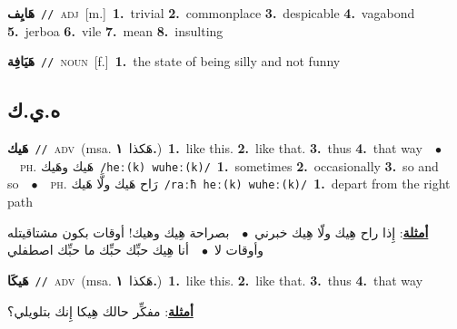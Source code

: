 \documentclass[10pt,a4paper,twoside]{article} %
\begin{document}
\begin{multicols}{2}
{\setlength\topsep{0pt}\textbf{\foreignlanguage{arabic}{هَايِف}}\ {\color{gray}\texttt{//}\color{black}}\ \textsc{adj}\ [m.]\ \textbf{1.}~trivial  \textbf{2.}~commonplace  \textbf{3.}~despicable  \textbf{4.}~vagabond  \textbf{5.}~jerboa  \textbf{6.}~vile  \textbf{7.}~mean  \textbf{8.}~insulting\ } \vspace{2mm}

{\setlength\topsep{0pt}\textbf{\foreignlanguage{arabic}{هَيَافِة}}\ {\color{gray}\texttt{//}\color{black}}\ \textsc{noun}\ [f.]\ \textbf{1.}~the state of being silly and not funny\ } \vspace{2mm}

\vspace{-3mm}
\subsection*{\color{blue}\foreignlanguage{arabic}{ه.ي.ك}\color{blue}{ (ntws)}} 

{\setlength\topsep{0pt}\textbf{\foreignlanguage{arabic}{هَيك}}\ {\color{gray}\texttt{//}\color{black}}\ \textsc{adv}\ \color{gray}(msa. \foreignlanguage{arabic}{هَكذا}~\foreignlanguage{arabic}{\textbf{١.}})\color{black}\ \textbf{1.}~like this.  \textbf{2.}~like that.  \textbf{3.}~thus  \textbf{4.}~that way\ \ $\bullet$\ \ \textsc{ph.} \color{gray} \foreignlanguage{arabic}{هَيك وهَيك}\color{black}\ {\color{gray}\texttt{/{\sffamily heː(k) wuheː(k)}/}\color{black}}\ \textbf{1.}~sometimes  \textbf{2.}~occasionally  \textbf{3.}~so and so\ \ $\bullet$\ \ \textsc{ph.} \color{gray} \foreignlanguage{arabic}{رَاح هَيك ولَّا هَيك}\color{black}\ {\color{gray}\texttt{/{\sffamily raːħ heː(k) wuheː(k)}/}\color{black}}\ \textbf{1.}~depart from the right path\  \begin{flushright}\color{gray}\foreignlanguage{arabic}{\textbf{\underline{\foreignlanguage{arabic}{أمثلة}}}: إِذا راح هِيك ولّا هِيك خبرني\ $\bullet$\ \  بصراحة هِيك وهيك! أوقات بكون مشتاقيتله وأوقات لا\ $\bullet$\ \  أنا هِيك حبِّك حبِّك ما حبِّك اصطفلي}\end{flushright}\color{black}} \vspace{2mm}

{\setlength\topsep{0pt}\textbf{\foreignlanguage{arabic}{هَيكَا}}\ {\color{gray}\texttt{//}\color{black}}\ \textsc{adv}\ \color{gray}(msa. \foreignlanguage{arabic}{هَكذا}~\foreignlanguage{arabic}{\textbf{١.}})\color{black}\ \textbf{1.}~like this.  \textbf{2.}~like that.  \textbf{3.}~thus  \textbf{4.}~that way\  \begin{flushright}\color{gray}\foreignlanguage{arabic}{\textbf{\underline{\foreignlanguage{arabic}{أمثلة}}}: مفكِّر حالك هِيكا إِنك بتلويلي؟}\end{flushright}\color{black}} \vspace{2mm}


\end{multicols}
\end{document}
